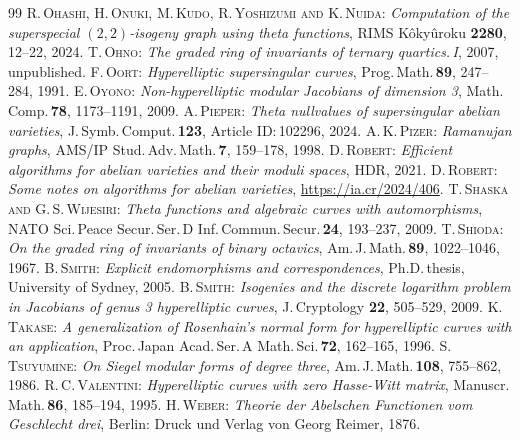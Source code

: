 \documentclass{amsart}
\theoremstyle{definition}
\theoremstyle{plain}
\begin{document}
\begin{thebibliography}{99}
 \textsc{R.\,Ohashi, H.\,Onuki, M.\,Kudo, R.\,Yoshizumi and K.\,Nuida}: \textit{Computation of the superspecial $(2,2)$-isogeny graph using theta functions}, RIMS Kôkyûroku {\bf 2280}, 12--22, 2024.
 \textsc{T.\,Ohno}: \textit{The graded ring of invariants of ternary quartics.\,I}, 2007, unpublished.
 \textsc{F.\,Oort}: \textit{Hyperelliptic supersingular curves}, Prog.\,Math.\,{\bf 89}, 247--284, 1991.
 \textsc{E.\,Oyono}: \textit{Non-hyperelliptic modular Jacobians of dimension 3}, Math.\,Comp.\,{\bf 78}, 1173--1191, 2009.
 \textsc{A.\,Pieper}: \textit{Theta nullvalues of supersingular abelian varieties}, J.\,Symb.\,Comput.\,{\bf 123}, Article ID:\,102296, 2024.
 \textsc{A.\,K.\,Pizer}: \textit{Ramanujan graphs}, AMS/IP Stud.\,Adv.\,Math.\,{\bf 7}, 159--178, 1998.
 \textsc{D.\,Robert}: \textit{Efficient algorithms for abelian varieties and their moduli spaces}, HDR, 2021.
 \textsc{D.\,Robert}: \textit{Some notes on algorithms for abelian varieties}, \url{https://ia.cr/2024/406}.
 \textsc{T.\,Shaska and G.\,S.\,Wijesiri}: \textit{Theta functions and algebraic curves with automorphisms}, NATO Sci.\,Peace Secur.\,Ser.\,D Inf.\,Commun.\,Secur.\,{\bf 24}, 193--237, 2009.
 \textsc{T.\,Shioda}: \textit{On the graded ring of invariants of binary octavics}, Am.\,J.\,Math.\,{\bf 89}, 1022--1046, 1967.
 \textsc{B.\,Smith}: \textit{Explicit endomorphisms and correspondences}, Ph.D.\,thesis, University of Sydney, 2005.
 \textsc{B.\,Smith}: \textit{Isogenies and the discrete logarithm problem in Jacobians of genus 3 hyperelliptic curves}, J.\,Cryptology {\bf 22}, 505--529, 2009.
 \textsc{K.\,Takase}: \textit{A generalization of Rosenhain's normal form for hyperelliptic curves with an application}, Proc.\,Japan Acad.\,Ser.\,A Math.\,Sci.\,{\bf 72}, 162--165, 1996.
 \textsc{S.\,Tsuyumine}: \textit{On Siegel modular forms of degree three}, Am.\,J.\,Math.\,{\bf 108}, 755--862, 1986.
 \textsc{R.\,C.\,Valentini}: \textit{Hyperelliptic curves with zero Hasse-Witt matrix}, Manuscr.\,Math.\,{\bf 86}, 185--194, 1995.
 \textsc{H.\,Weber}: \textit{Theorie der Abelschen Functionen vom Geschlecht drei}, Berlin: Druck und Verlag von Georg Reimer, 1876.
\end{thebibliography}
\vfill
\noindent\hrulefill\smallskip
\end{document}

